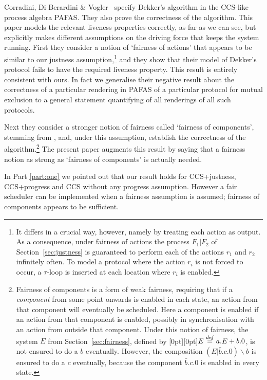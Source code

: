 \documentclass[smallcondensed]{svjour3}
\newcommand{\plat}[1]{\raisebox{0pt}[0pt][0pt]{#1}}  \def\precond#1{{\vphantom{#1}}^\bullet #1}
\newcommand{\Part}[1]{Part {\ref{part:#1}}}
\newcommand{\Sect}[1]{Section~\ref{sec:#1}}
\newcommand{\mand}{\&\xspace}
\newcounter {part}
\begin{document}
Corradini, Di Berardini \mand Vogler~\cite{CorradiniEtAl09}
specify Dekker's algorithm in the CCS-like process algebra PAFAS. 
They also prove the correctness 
of the algorithm. This paper models the relevant liveness properties correctly, as far
as we can see, but explicitly makes different assumptions on the driving
force that keeps the system running. First they consider a notion of
`fairness of actions' that appears to be similar to our
justness assumption,\footnote{It differs in a crucial way,
    however, namely by treating each action as output. As a
    consequence, under fairness of actions the process $F_1|F_2$ of
    \Sect{justness} is guaranteed to perform each of the actions $r_1$
    and $r_2$ infinitely often.  To model a protocol where the action
    $r_i$ is not forced to occur, a $\tau$-loop is inserted 
    at each location where $r_{i}$ is enabled.}
    and they show that their model of Dekker's protocol fails
to have the required liveness property. This result is entirely
consistent with ours. In fact we generalise their negative result
about the correctness of a particular rendering in PAFAS of a
particular protocol for mutual exclusion to a general statement
quantifying of all renderings of all such protocols.

Next they consider a stronger notion of fairness called `fairness
of components', stemming from \cite{CS87}, and, under this assumption, establish the correctness of
the algorithm.\footnote{Fairness of components is a form of weak fairness,
requiring that if a \emph{component} from some point onwards is enabled in each state, an action
from that component will eventually be scheduled.
Here a component is enabled if an action from that component is enabled, possibly in synchronisation
with an action from outside that component.\vspace{2pt} Under this notion of fairness, the system $E$
from \Sect{fairness}, defined by \plat{$E \stackrel{{\it def}}{=} a.E + b.0$}, is not ensured to do
a $b$ eventually. However, the composition $(E|\bar b.c.0)\backslash b$ is ensured to do a $c$
eventually, because the component $\bar b.c.0$ is enabled in every state.}
The present paper augments this result by saying that a fairness notion as strong as `fairness
of components' is actually needed. 

In \Part{one} we pointed out that our result holds for CCS+justness, CCS+progress and CCS without any progress assumption. 
However a fair scheduler can be implemented when a fairness assumption is assumed; fairness of
components appears to be sufficient. 
\end{document}
